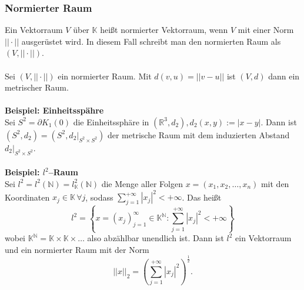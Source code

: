 \documentclass[a4paper,12pt]{article}
\begin{document}
\subsubsection{Normierter Raum}
Ein Vektorraum $V$ über $\mathbb{K}$ heißt normierter Vektorraum, wenn $V$ mit einer Norm $||\cdot ||$  ausgerüstet wird. In diesem Fall schreibt man den normierten Raum als $\left(V,||\cdot ||\right)$.\\\\\noindent
Sei $\left(V,||\cdot ||\right)$ ein normierter Raum. Mit $d\left(v,u\right)=||v-u|| $ ist $\left(V,d\right)$ dann ein metrischer Raum.
\\\hfill\\\textbf{Beispiel: Einheitsspähre}\\ 
Sei $S^2=\partial K_1\left(0\right)$ die Einheitssphäre in $\left(\mathbb{R}^3,d_2\right),d_2\left(x,y\right):=|x-y|$. Dann ist $\left(S^2,d_2\right)=\left(S^2,d_2|_{S^2\times S^2}\right)$ der metrische Raum mit dem induzierten Abstand $d_2|_{S^2\times S^2}$.
\\\hfill\\\textbf{Beispiel: $l^2$--Raum}\\ 
Sei $l^2=l^2\left(\mathbb{N}\right)=l^2_{\mathbb{K}}\left(\mathbb{N}\right)$ die Menge aller Folgen $x=\left(x_1,x_2,\hdots ,x_n\right)$ mit den Koordinaten $x_j \in \mathbb{K}\,\forall j$, sodass $\sum_{j=1}^{+\infty}|x_j|^2<+\infty$. Das heißt
\[ 
        l^2=\left\{x=\left(x_j\right)^\infty_{j=1} \in \mathbb{K}^{\mathbb{N}}:\sum_{j=1}^{+\infty}|x_j|^2<+\infty\right\}
\] 
wobei $\mathbb{K}^{\mathbb{N}}=\mathbb{K}\times \mathbb{K}\times \hdots $ also abzählbar unendlich ist. Dann ist $l^2$ ein Vektorraum und ein normierter Raum mit der Norm
\[ 
        ||x||_2=\left(\sum_{j=1}^{+\infty}|x_j|^2\right)^{\tfrac{1}{2}}
.\] 
\end{document}
